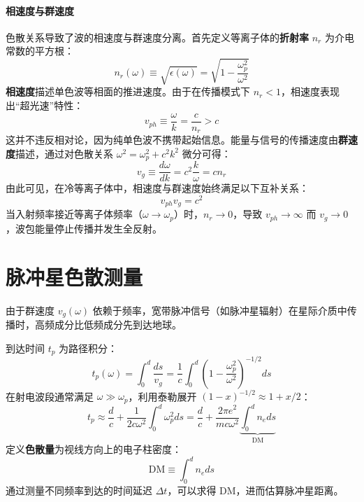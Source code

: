 \paragraph{相速度与群速度}
色散关系导致了波的相速度与群速度分离。首先定义等离子体的\textbf{折射率} $n_r$ 为介电常数的平方根：
\begin{equation}
    n_r(\omega) \equiv \sqrt{\epsilon(\omega)} = \sqrt{1 - \frac{\omega_p^2}{\omega^2}}
\end{equation}
\textbf{相速度}描述单色波等相面的推进速度。由于在传播模式下 $n_r < 1$，相速度表现出“超光速”特性：
\begin{equation}
    v_{ph} \equiv \frac{\omega}{k} = \frac{c}{n_r} > c
\end{equation}
这并不违反相对论，因为纯单色波不携带起始信息。能量与信号的传播速度由\textbf{群速度}描述，通过对色散关系 $\omega^2 = \omega_p^2 + c^2k^2$ 微分可得：
\begin{equation}
    v_g \equiv \frac{d\omega}{dk} = c^2 \frac{k}{\omega} = c n_r
\end{equation}
由此可见，在冷等离子体中，相速度与群速度始终满足以下互补关系：
\begin{equation}
    v_{ph} v_g = c^2
\end{equation}
当入射频率接近等离子体频率（$\omega \to \omega_p$）时，$n_r \to 0$，导致 $v_{ph} \to \infty$ 而 $v_g \to 0$，波包能量停止传播并发生全反射。
\section{脉冲星色散测量}

由于群速度 $v_g(\omega)$ 依赖于频率，宽带脉冲信号（如脉冲星辐射）在星际介质中传播时，高频成分比低频成分先到达地球。

到达时间 $t_p$ 为路径积分：
\begin{equation}
    t_p(\omega) = \int_0^d \frac{ds}{v_g} = \frac{1}{c} \int_0^d \left( 1 - \frac{\omega_p^2}{\omega^2} \right)^{-1/2} ds
\end{equation}
在射电波段通常满足 $\omega \gg \omega_p$，利用泰勒展开 $(1-x)^{-1/2} \approx 1 + x/2$：
\begin{equation}
    t_p \approx \frac{d}{c} + \frac{1}{2c\omega^2} \int_0^d \omega_p^2 ds = \frac{d}{c} + \frac{2\pi e^2}{mc\omega^2} \underbrace{\int_0^d n_e ds}_{\text{DM}}
\end{equation}
定义\textbf{色散量}为视线方向上的电子柱密度：
\begin{equation}
    \text{DM} \equiv \int_0^d n_e ds
\end{equation}
通过测量不同频率到达的时间延迟 $\Delta t$，可以求得 DM，进而估算脉冲星距离。

